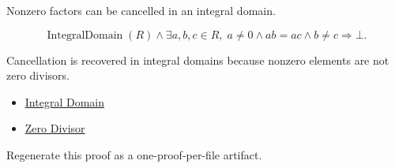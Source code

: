 \begin{remark*}
Nonzero factors can be cancelled in an integral domain.
\end{remark*}

\begin{remark*}
\[
\operatorname{IntegralDomain}(R)
\land
\exists a,b,c\in R,\; a\neq0 \land ab=ac \land b\neq c
\Longrightarrow \bot.
\]
\end{remark*}

\begin{remark*}[Interpretation]
Cancellation is recovered in integral domains because nonzero elements are not
zero divisors.
\end{remark*}

\begin{dependencies}
\begin{itemize}
  \item \hyperref[def:algebraic-integral-domain]{Integral Domain}
  \item \hyperref[def:zero-divisor]{Zero Divisor}
\end{itemize}
\end{dependencies}

\begin{remark*}
Regenerate this proof as a one-proof-per-file artifact.
\end{remark*}
